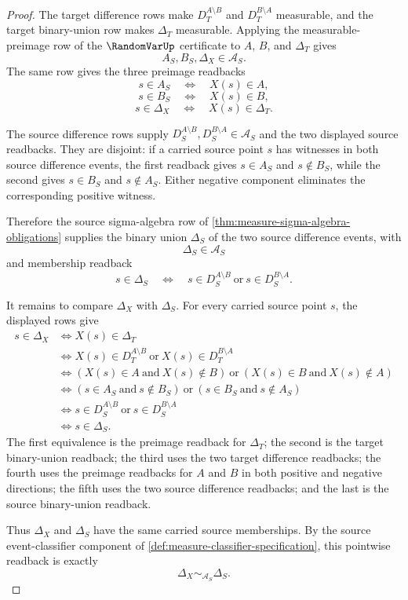 \begin{proof}
The target difference rows make $D_T^{A\setminus B}$ and $D_T^{B\setminus A}$ measurable, and the target binary-union row makes $\Delta_T$ measurable. Applying the measurable-preimage row of the $\RandomVarUp$ certificate to $A$, $B$, and $\Delta_T$ gives
$$
A_S,B_S,\Delta_X\in\mathcal{A}_S.
$$
The same row gives the three preimage readbacks
$$
s\in A_S\quad\Longleftrightarrow\quad X(s)\in A,
$$
$$
s\in B_S\quad\Longleftrightarrow\quad X(s)\in B,
$$
$$
s\in\Delta_X\quad\Longleftrightarrow\quad X(s)\in\Delta_T.
$$

The source difference rows supply $D_S^{A\setminus B},D_S^{B\setminus A}\in\mathcal{A}_S$ and the two displayed source readbacks. They are disjoint: if a carried source point $s$ has witnesses in both source difference events, the first readback gives $s\in A_S$ and $s\notin B_S$, while the second gives $s\in B_S$ and $s\notin A_S$. Either negative component eliminates the corresponding positive witness.

Therefore the source sigma-algebra row of \autoref{thm:measure-sigma-algebra-obligations} supplies the binary union $\Delta_S$ of the two source difference events, with
$$
\Delta_S\in\mathcal{A}_S
$$
and membership readback
$$
s\in\Delta_S\quad\Longleftrightarrow\quad s\in D_S^{A\setminus B}\ \text{or}\ s\in D_S^{B\setminus A}.
$$

It remains to compare $\Delta_X$ with $\Delta_S$. For every carried source point $s$, the displayed rows give
$$
\begin{aligned}
s\in\Delta_X
&\Longleftrightarrow X(s)\in\Delta_T\\
&\Longleftrightarrow X(s)\in D_T^{A\setminus B}\ \text{or}\ X(s)\in D_T^{B\setminus A}\\
&\Longleftrightarrow (X(s)\in A\ \text{and}\ X(s)\notin B)\ \text{or}\ (X(s)\in B\ \text{and}\ X(s)\notin A)\\
&\Longleftrightarrow (s\in A_S\ \text{and}\ s\notin B_S)\ \text{or}\ (s\in B_S\ \text{and}\ s\notin A_S)\\
&\Longleftrightarrow s\in D_S^{A\setminus B}\ \text{or}\ s\in D_S^{B\setminus A}\\
&\Longleftrightarrow s\in\Delta_S.
\end{aligned}
$$
The first equivalence is the preimage readback for $\Delta_T$; the second is the target binary-union readback; the third uses the two target difference readbacks; the fourth uses the preimage readbacks for $A$ and $B$ in both positive and negative directions; the fifth uses the two source difference readbacks; and the last is the source binary-union readback.

Thus $\Delta_X$ and $\Delta_S$ have the same carried source memberships. By the source event-classifier component of \autoref{def:measure-classifier-specification}, this pointwise readback is exactly
$$
\Delta_X\sim_{\mathcal{A}_S}\Delta_S.
$$
\end{proof}
